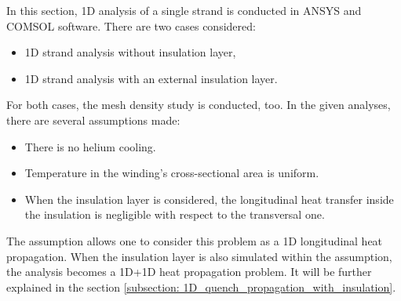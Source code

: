 
In this section, 1D analysis of a single strand is conducted in ANSYS and COMSOL software. There are two cases considered: 

\begin{itemize}
    \item 1D strand analysis without insulation layer,
    \item 1D strand analysis with an external insulation layer.
\end{itemize}

For both cases, the mesh density study is conducted, too. In the given analyses, there are several assumptions made: 

\begin{itemize}
    \item There is no helium cooling.
    \item Temperature in the winding's cross-sectional area is uniform.
    \item When the insulation layer is considered, the longitudinal heat transfer inside the insulation is negligible with respect to the transversal one.
\end{itemize}

The  assumption allows one to consider this problem as a 1D longitudinal heat propagation. When the insulation layer is also simulated within the  assumption, the analysis becomes a 1D+1D heat propagation problem. It will be further explained in the section \ref{subsection: 1D_quench_propagation_with_insulation}.
